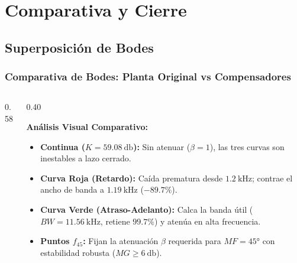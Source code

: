 
\section{Comparativa y Cierre}

\subsection{Superposición de Bodes}
\begin{frame}
  \frametitle{Comparativa de Bodes: Planta Original vs Compensadores}

  \begin{columns}[c, onlytextwidth]
    \begin{column}{0.58\textwidth}
      \centering
    \end{column}

    \begin{column}{0.40\textwidth}
      \begin{tarjeta}[top=4pt, bottom=4pt]
        {\fontsize{8.5pt}{10pt}\selectfont \textbf{\color{NavyDark} Análisis Visual Comparativo:}}\\[2pt]
        {\fontsize{7.0pt}{8.5pt}\selectfont
        \begin{itemize}\setlength{\itemsep}{1.5pt}
          \item \textbf{Continua ($K = \qty{59.08}{\decibel}$):} Sin atenuar ($\beta = 1$), las tres curvas son inestables a lazo cerrado.
          \item \textbf{Curva Roja (Retardo):} Caída prematura desde $\qty{1.2}{\kilo\hertz}$; contrae el ancho de banda a $\qty{1.19}{\kilo\hertz}$ ($\mathbf{-89.7\%}$).
          \item \textbf{Curva Verde (Atraso-Adelanto):} Calca la banda útil ($BW = \qty{11.56}{\kilo\hertz}$, retiene $\mathbf{99.7\%}$) y atenúa en alta frecuencia.
          \item \textbf{Puntos $f_{45}$:} Fijan la atenuación $\beta$ requerida para $MF = \ang{45}$ con estabilidad robusta ($MG \ge \qty{6}{\decibel}$).
        \end{itemize}
        }
      \end{tarjeta}
    \end{column}
  \end{columns}
\end{frame}

